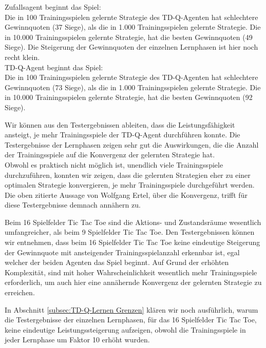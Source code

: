 
Zufallsagent beginnt das Spiel: \\
Die in 100 Trainingsspielen gelernte Strategie des TD-Q-Agenten hat schlechtere Gewinnquoten (37 Siege), als die in 1.000 Trainingsspielen gelernte Strategie. Die in 10.000 Trainingsspielen gelernte Strategie, hat die besten Gewinnquoten (49 Siege). Die Steigerung der Gewinnquoten der einzelnen Lernphasen ist hier noch recht klein. \\

TD-Q-Agent beginnt das Spiel: \\
Die in 100 Trainingsspielen gelernte Strategie des TD-Q-Agenten hat schlechtere Gewinnquoten (73 Siege), als die in 1.000 Trainingsspielen gelernte Strategie. Die in 10.000 Trainingsspielen gelernte Strategie, hat die besten Gewinnquoten (92 Siege).  

Wir können aus den Testergebnissen ableiten, dass die Leistungsfähigkeit ansteigt, je mehr Trainingsspiele der TD-Q-Agent durchführen konnte. Die Testergebnisse der Lernphasen zeigen sehr gut die Auswirkungen, die die Anzahl der Trainingsspiele auf die Konvergenz der gelernten Strategie hat. \\

Obwohl es praktisch nicht möglich ist, unendlich viele Trainingsspiele durchzuführen, konnten wir zeigen, dass die gelernten Strategien eher zu einer optimalen Strategie konvergieren, je mehr Trainingsspiele durchgeführt werden. Die oben zitierte Aussage von Wolfgang Ertel, über die Konvergenz, trifft für diese Testergebnisse demnach annähern zu. \\


Beim 16 Spielfelder Tic Tac Toe sind die Aktions- und Zustandsräume wesentlich umfangreicher, als beim 9 Spielfelder Tic Tac Toe. Den Testergebnissen können wir entnehmen, dass beim 16 Spielfelder Tic Tac Toe keine eindeutige Steigerung der Gewinnquote mit ansteigender Trainingsspielanzahl erkennbar ist, egal welcher der beiden Agenten das Spiel beginnt. Auf Grund der erhöhten Komplexität, sind mit hoher Wahrscheinlichkeit wesentlich mehr Trainingsspiele erforderlich, um auch hier eine annähernde Konvergenz der gelernten Strategie zu erreichen.

In Abschnitt \ref{subsec:TD-Q-Lernen Grenzen} klären wir noch ausführlich, warum die Testergebnisse der einzelnen Lernphasen, für das 16 Spielfelder Tic Tac Toe, keine eindeutige Leistungssteigerung aufzeigen, obwohl die Trainingsspiele in jeder Lernphase um Faktor 10 erhöht wurden. \\

